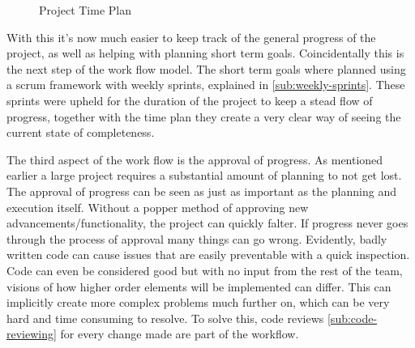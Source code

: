     \begin{figure}[H]
        \centering
        \caption{Project Time Plan}
        \label{fig:time-plan}
    \end{figure}

    With this it's now much easier to keep track of the general progress of the project, as well as helping with planning short term goals. Coincidentally this is the next step of the work flow model. The short term goals where planned using a scrum framework with weekly sprints, explained in \ref{sub:weekly-sprints}. These sprints were upheld for the duration of the project to keep a stead flow of progress, together with the time plan they create a very clear way of seeing the current state of completeness. 

    The third aspect of the work flow is the approval of progress. As mentioned earlier a large project requires a substantial amount of planning to not get lost. The approval of progress can be seen as just as important as the planning and execution itself. Without a popper method of approving new advancements/functionality, the project can quickly falter. If progress never goes through the process of approval many things can go wrong. Evidently, badly written code can cause issues that are easily preventable with a quick inspection. Code can even be considered good but with no input from the rest of the team, visions of how higher order elements will be implemented can differ. This can implicitly create  more complex problems much further on, which can be very hard and time consuming to resolve. To solve this, code reviews \ref{sub:code-reviewing} for every change made are part of the workflow.  

